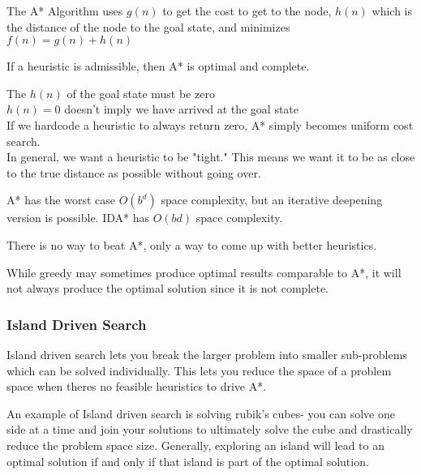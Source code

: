 \documentclass{chezarticle}
\begin{document}
\begin{algorithm}
The A* Algorithm uses $g(n)$ to get the cost to get to the node, $h(n)$ which is the distance of the node to the goal state, and minimizes $f(n) = g(n) + h(n)$
\end{algorithm}
If a heuristic is admissible, then A* is optimal and complete.
\begin{note}
The $h(n)$ of the goal state must be zero\\
$h(n) = 0 $ doesn't imply we have arrived at the goal state\\
If we hardcode a heuristic to always return zero, A* simply becomes uniform cost search.\\
In general, we want a heuristic to be "tight." This means we want it to be as close to the true distance as possible without going over.\\
\end{note}
A* has the worst case $O(b^d)$ space complexity, but an iterative deepening version is possible. IDA* has $O(bd)$ space complexity.
\\
\begin{note}
There is no way to beat A*, only a way to come up with better heuristics.
\end{note}
While greedy may sometimes produce optimal results comparable to A*, it will not always produce the optimal solution since it is not complete.
\\
\subsubsection{Island Driven Search}
\begin{definition}
Island driven search lets you break the larger problem into smaller sub-problems which can be solved individually. This lets you reduce the space of a problem space when theres no feasible heuristics to drive A*.
\end{definition}
An example of Island driven search is solving rubik's cubes- you can solve one side at a time and join your solutions to ultimately solve the cube and drastically reduce the problem space size. Generally, exploring an island will lead to an optimal solution if and only if that island is part of the optimal solution. 
\end{document}
